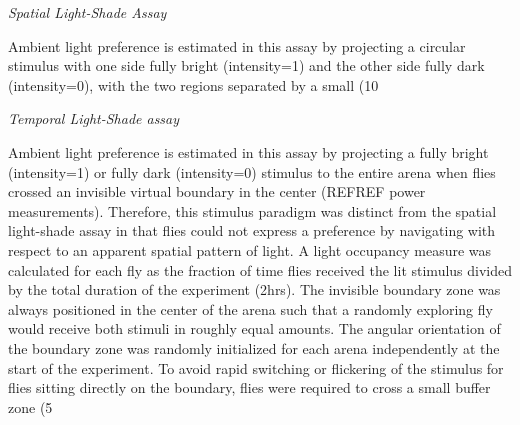\documentclass[12pt,letterpaper]{article}
\begin{document}
\textit{Spatial Light-Shade Assay}

Ambient light preference is estimated in this assay by projecting a circular stimulus with one side fully bright (intensity=1) and the other side fully dark (intensity=0), with the two regions separated by a small (10%

\textit{Temporal Light-Shade assay}

Ambient light preference is estimated in this assay by projecting a fully bright (intensity=1) or fully dark (intensity=0) stimulus to the entire arena when flies crossed an invisible virtual boundary in the center (REFREF power measurements). Therefore, this stimulus paradigm was distinct from the spatial light-shade assay in that flies could not express a preference by navigating with respect to an apparent spatial pattern of light. A light occupancy measure was calculated for each fly as the fraction of time flies received the lit stimulus divided by the total duration of the experiment (2hrs). The invisible boundary zone was always positioned in the center of the arena such that a randomly exploring fly would receive both stimuli in roughly equal amounts. The angular orientation of the boundary zone was randomly initialized for each arena independently at the start of the experiment. To avoid rapid switching or flickering of the stimulus for flies sitting directly on the boundary, flies were required to cross a small buffer zone (5%
\end{document}
